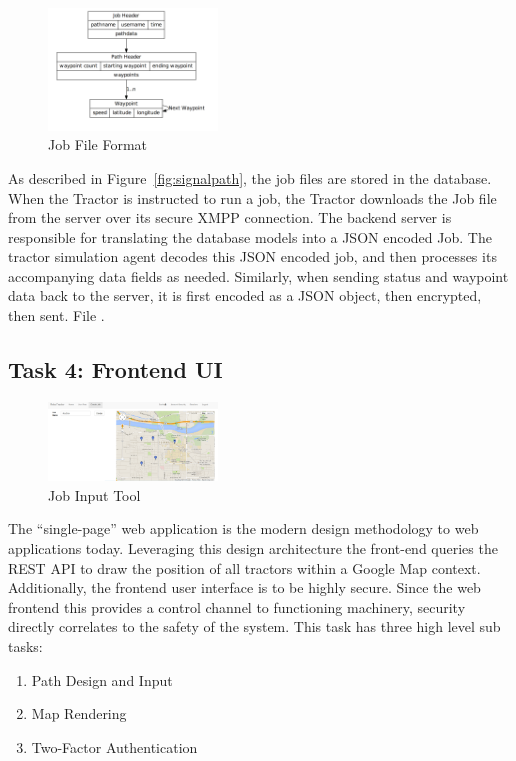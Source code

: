 \documentclass[conference,12pt]{IEEEtran}
\begin{document}
\begin{figure}
\centering
\includegraphics[width=0.4\textwidth]{Images/job_file.png}
\caption{Job File Format}
\label{fig:job_file}
\end{figure}

As described in Figure~\ref{fig:signalpath}, the job files are stored in the
database. When the Tractor is instructed to run a job, the Tractor downloads the
Job file from the server over its secure XMPP connection. The backend server is
responsible for translating the database models into a JSON encoded Job. The tractor simulation agent decodes this JSON encoded job, and then processes its accompanying data fields as needed. Similarly, when sending status and waypoint data back to the server, it is first encoded as a JSON object, then encrypted, then sent. 
File \autocite{_json_2014}.

\subsection{Task 4: Frontend UI}
\begin{figure}
\centering
\includegraphics[width=0.4\textwidth]{Images/PlottingV1.png}
\caption{Job Input Tool}
\label{fig:jobinput}
\end{figure}

The ``single-page'' web application is the modern design methodology to web
applications today. Leveraging this design architecture the front-end queries the REST API
to draw the position of all tractors within a Google Map context. Additionally, 
the frontend user interface is to be highly secure. Since the web frontend this provides a control
channel to functioning machinery, security directly correlates to the safety of
the system. This task has
three high level sub tasks:

\begin{enumerate}
\item Path Design and Input
\item Map Rendering
\item Two-Factor Authentication
\end{enumerate}
\end{document}
